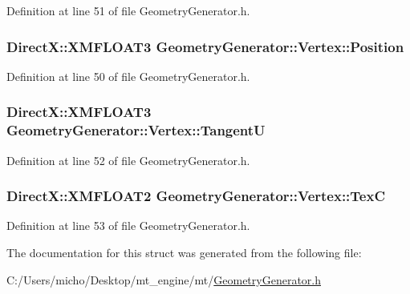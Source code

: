 Definition at line 51 of file Geometry\+Generator.\+h.

\subsubsection[{\texorpdfstring{Position}{Position}}]{\setlength{\rightskip}{0pt plus 5cm}Direct\+X\+::\+X\+M\+F\+L\+O\+A\+T3 Geometry\+Generator\+::\+Vertex\+::\+Position}\hypertarget{struct_geometry_generator_1_1_vertex_ad31c2a7a30542745c70422a0cb34d22d_ad31c2a7a30542745c70422a0cb34d22d}{}\label{struct_geometry_generator_1_1_vertex_ad31c2a7a30542745c70422a0cb34d22d_ad31c2a7a30542745c70422a0cb34d22d}


Definition at line 50 of file Geometry\+Generator.\+h.

\subsubsection[{\texorpdfstring{TangentU}{TangentU}}]{\setlength{\rightskip}{0pt plus 5cm}Direct\+X\+::\+X\+M\+F\+L\+O\+A\+T3 Geometry\+Generator\+::\+Vertex\+::\+TangentU}\hypertarget{struct_geometry_generator_1_1_vertex_a717df2eee4e35bb0eb8f4ecf262edf4f_a717df2eee4e35bb0eb8f4ecf262edf4f}{}\label{struct_geometry_generator_1_1_vertex_a717df2eee4e35bb0eb8f4ecf262edf4f_a717df2eee4e35bb0eb8f4ecf262edf4f}


Definition at line 52 of file Geometry\+Generator.\+h.

\subsubsection[{\texorpdfstring{TexC}{TexC}}]{\setlength{\rightskip}{0pt plus 5cm}Direct\+X\+::\+X\+M\+F\+L\+O\+A\+T2 Geometry\+Generator\+::\+Vertex\+::\+TexC}\hypertarget{struct_geometry_generator_1_1_vertex_ab18dadcdb6a57e997bfd6d0e53e426c6_ab18dadcdb6a57e997bfd6d0e53e426c6}{}\label{struct_geometry_generator_1_1_vertex_ab18dadcdb6a57e997bfd6d0e53e426c6_ab18dadcdb6a57e997bfd6d0e53e426c6}


Definition at line 53 of file Geometry\+Generator.\+h.



The documentation for this struct was generated from the following file\+:\begin{DoxyCompactItemize}
\item 
C\+:/\+Users/micho/\+Desktop/mt\+\_\+engine/mt/\hyperlink{_geometry_generator_8h}{Geometry\+Generator.\+h}\end{DoxyCompactItemize}
